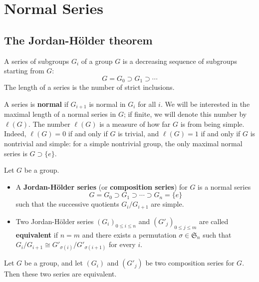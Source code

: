 \section{Normal Series}
\subsection{The Jordan-H\"older theorem} 
A series of subgroups $G_i$ of a group $G$ is a decreasing sequence of subgroups starting from $G$:
\[G=G_0\supset G_1\supset\cdots\]
The length of a series is the number of strict inclusions.\par
A series is \textbf{normal} if $G_{i+1}$ is normal in $G_i$ for all $i$. We will be interested in the maximal length of a normal series in $G$; if finite, we will denote this number by $\ell(G)$. The number $\ell(G)$ is a measure of how far $G$ is from being simple. Indeed, $\ell(G)=0$ if and only if $G$ is trivial, and $\ell(G)=1$ if and only if $G$ is nontrivial and simple: for a simple nontrivial group, the only maximal normal series is $G\supset\{e\}$.
\begin{definition}
Let $G$ be a group.
\begin{itemize}
\item A \textbf{Jordan-H\"older series} (or \textbf{composition series}) for $G$ is a normal series
\[G=G_0\supset G_1\supset\cdots\supset G_n=\{e\}\]
such that the successive quotients $G_i/G_{i+1}$ are simple.
\item Two Jordan-H\"older series $(G_i)_{0\leq i\leq n}$ and $(G'_j)_{0\leq j\leq m}$ are called \textbf{equivalent} if $n=m$ and there exists a permutation $\sigma\in\mathfrak{S}_n$ such that $G_i/G_{i+1}\cong G'_{\sigma(i)}/G'_{\sigma(i+1)}$ for every $i$.
\end{itemize}
\end{definition}
\begin{theorem}
Let $G$ be a group, and let $(G_i)$ and $(G'_j)$ be two composition series for $G$. Then these two series are equivalent.
\end{theorem}
